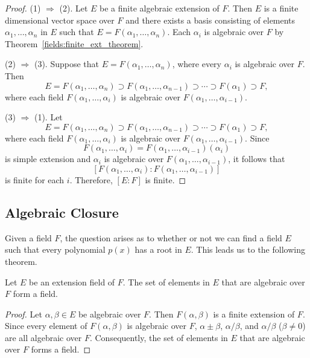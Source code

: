 \begin{proof}
(1) $\Rightarrow$ (2).
Let $E$ be a finite algebraic extension of $F$.  Then $E$ is a finite
dimensional vector space over $F$ and there exists a basis consisting 
of elements $\alpha_1, \ldots, \alpha_n$ in $E$ such that $E =
F(\alpha_1, \ldots, \alpha_n)$. Each $\alpha_i$ is algebraic over $F$
by Theorem~\ref{fields:finite_ext_theorem}. 


(2) $\Rightarrow$ (3).
Suppose that  $E = F(\alpha_1, \ldots, \alpha_n)$, where every
$\alpha_i$ is algebraic over $F$. Then 
\[
E = F(\alpha_1, \ldots, \alpha_n) \supset F(\alpha_1,
\ldots, \alpha_{n-1} ) \supset \cdots \supset
 F( \alpha_1 ) \supset F,
\]
where each field $F(\alpha_1, \ldots, \alpha_i)$ is algebraic over 
$F(\alpha_1, \ldots, \alpha_{i-1})$.
 

(3) $\Rightarrow$ (1). 
Let 
\[
E = F(\alpha_1, \ldots, \alpha_n) \supset F(\alpha_1,
\ldots, \alpha_{n-1} ) \supset \cdots \supset
 F( \alpha_1 ) \supset F,
\]
where each field $F(\alpha_1, \ldots, \alpha_i)$ is algebraic over 
$F(\alpha_1, \ldots, \alpha_{i-1})$. Since 
\[
F(\alpha_1, \ldots, \alpha_i) = 
F(\alpha_1, \ldots, \alpha_{i-1} )(\alpha_i)
\]
is simple extension and $\alpha_i$ is algebraic over $F(\alpha_1,
\ldots, \alpha_{i-1})$, it follows that
\[
[ F(\alpha_1, \ldots, \alpha_i) : F(\alpha_1, \ldots, \alpha_{i-1} )]
\]
is finite for each $i$. Therefore, $[E : F]$ is finite.
\end{proof}
 

 
\subsection*{Algebraic Closure}


Given a field $F$, the question arises as to whether or not we can
find a field $E$ such that every polynomial $p(x)$ has a root in $E$.
This leads us to the following theorem.

 
\begin{theorem}
Let $E$ be an extension field of $F$. The set of elements in $E$ that
are algebraic over $F$ form a field.
\end{theorem}
 
 
\begin{proof}
Let $\alpha, \beta \in E$ be algebraic over $F$. Then $F( \alpha,
\beta )$ is a finite extension of $F$.  Since every element of $F(
\alpha, \beta )$ is algebraic over $F$, $\alpha \pm \beta$, $\alpha /
\beta$, and $\alpha / \beta$ ($\beta \neq 0$) are all algebraic over
$F$. Consequently, the set of elements in $E$ that are algebraic over
$F$ forms a field.  
\end{proof}

